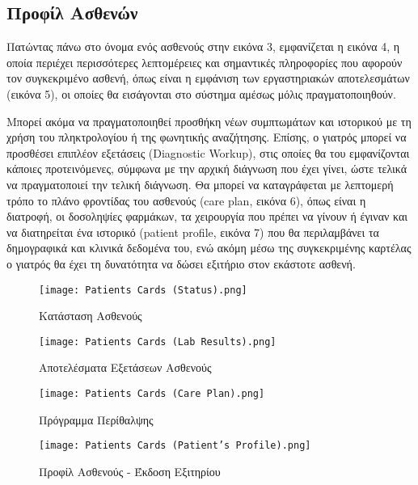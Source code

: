 \documentclass{article}
\begin{document}
\subsection{Προφίλ Ασθενών}

Πατώντας πάνω στο όνομα ενός ασθενούς στην εικόνα 3, εμφανίζεται η εικόνα 4, η οποία περιέχει περισσότερες λεπτομέρειες και σημαντικές πληροφορίες που αφορούν τον συγκεκριμένο ασθενή, όπως είναι η εμφάνιση των εργαστηριακών αποτελεσμάτων (εικόνα 5), οι οποίες θα εισάγονται στο σύστημα αμέσως μόλις πραγματοποιηθούν. \par
Μπορεί ακόμα να πραγματοποιηθεί προσθήκη νέων συμπτωμάτων και ιστορικού με τη χρήση του πληκτρολογίου ή της φωνητικής αναζήτησης. Επίσης, ο γιατρός μπορεί να προσθέσει επιπλέον εξετάσεις (Diagnostic Workup), στις οποίες θα του εμφανίζονται κάποιες προτεινόμενες, σύμφωνα με την αρχική διάγνωση που έχει γίνει, ώστε τελικά να πραγματοποιεί την τελική διάγνωση.
Θα μπορεί να καταγράφεται με λεπτομερή τρόπο το πλάνο φροντίδας του ασθενούς (care plan, εικόνα 6), όπως είναι η διατροφή, οι δοσοληψίες φαρμάκων, τα χειρουργία που πρέπει να γίνουν ή έγιναν και να διατηρείται ένα ιστορικό (patient profile, εικόνα 7) που θα περιλαμβάνει τα δημογραφικά και κλινικά δεδομένα του, ενώ ακόμη μέσω της συγκεκριμένης καρτέλας ο γιατρός θα έχει τη δυνατότητα να δώσει εξιτήριο στον εκάστοτε ασθενή.

\begin{figure}[!htb]
\centering
\texttt{[image: Patients Cards (Status).png]}
\caption{\label{fig:patient profile} Κατάσταση Ασθενούς}
\end{figure}

\newpage

\begin{figure}[!htb]
\centering
\texttt{[image: Patients Cards (Lab Results).png]}
\caption{\label{fig:Lab Results} Αποτελέσματα Εξετάσεων Ασθενούς}
\end{figure}

\begin{figure}[!htb]
\centering
\texttt{[image: Patients Cards (Care Plan).png]}
\caption{\label{fig:Care Plan} Πρόγραμμα Περίθαλψης}
\end{figure}

\vspace{0.3cm}

\begin{figure}[!htb]
\centering
\texttt{[image: Patients Cards (Patient's Profile).png]}
\caption{\label{fig:Discharge} Προφίλ Ασθενούς - Έκδοση Εξιτηρίου}
\end{figure}
\end{document}
